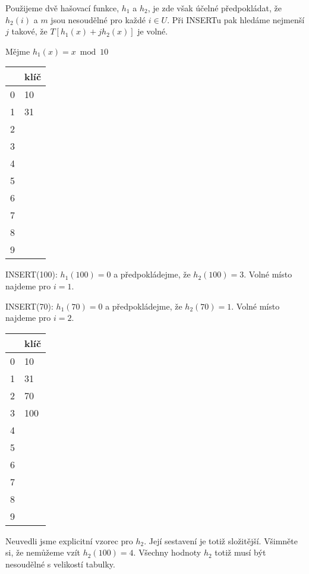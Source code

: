 Použijeme dvě hašovací funkce, $h_1$ a $h_2$, je zde však účelné předpokládat, 
že $h_2(i)$ a $m$ jsou nesoudělné pro každé $i\in U$. Při INSERTu pak hledáme
nejmenší $j$ takové, že $T[h_1(x) + j h_2(x)]$ je volné.

\begin{priklad}
Mějme $h_1(x) = x \bmod 10$

\vspace{5mm}

\begin{tabular}{|l|l|}
\hline
& klíč\\
\hline
0& 10\\
1& 31\\
2& \\
3& \\
4& \\
5& \\
6& \\
7& \\
8& \\
9& \\
\hline
\end{tabular}

\vspace{5mm}

INSERT(100): $h_1(100)=0$ a předpokládejme, že $h_2(100)=3$. Volné
místo najdeme pro $i=1$.

INSERT(70): $h_1(70)=0$ a předpokládejme, že $h_2(70)=1$. Volné
místo najdeme pro $i=2$.

\vspace{5mm}

\begin{tabular}{|l|l|}
\hline
& klíč\\
\hline
0& 10\\
1& 31\\
2& 70\\
3& 100\\
4& \\
5& \\
6& \\
7& \\
8& \\
9& \\
\hline
\end{tabular}
\end{priklad}

\vspace{5mm}

Neuvedli jsme explicitní vzorec pro $h_2$. Její sestavení je totiž
složitější. Všimněte si, že nemůžeme vzít $h_2(100)=4$. Všechny
hodnoty $h_2$ totiž musí být nesoudělné s velikostí tabulky.

